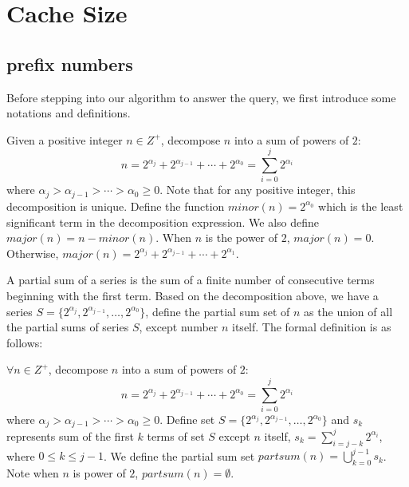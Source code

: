 \section{Cache Size}
\label{sec:cache size}

\subsection{prefix numbers}

Before stepping into our algorithm to answer the query, we first introduce some notations and definitions.

\begin{definition}
\label{defn: major&minor}
Given a positive integer $n\in Z^+$, decompose $n$ into a sum of powers of $2$: 
\[
n = 2^{\alpha_j}+2^{\alpha_{j-1}}+ \cdots + 2^{\alpha_0} = \sum_{i=0}^j2^{\alpha_i}
\]
where $\alpha_j>\alpha_{j-1}>\cdots>\alpha_0\geq 0$. Note that for any positive integer, this decomposition is unique.
Define the function $minor(n) = 2^{\alpha_0}$ which is the least significant term in the decomposition expression.
We also define $major(n) = n - minor(n)$. When $n$ is the power of $2$, $major(n) = 0$. Otherwise, $major(n) = 2^{\alpha_j}+2^{\alpha_{j-1}}+ \cdots + 2^{\alpha_1}$.
\end{definition}

A partial sum of a series is the sum of a finite number of consecutive terms beginning with the first term. Based on the decomposition above, we have a series $S = \{2^{\alpha_j}, 2^{\alpha_{j-1}}, \ldots, 2^{\alpha_0}\}$, define the partial sum set of $n$ as the union of all the partial sums of series $S$, except number $n$ itself. The formal definition is as follows:

\begin{definition}
\label{defn: partial sum set}
$\forall n\in Z^+$, decompose $n$ into a sum of powers of $2$:
\[
n = 2^{\alpha_j}+2^{\alpha_{j-1}}+ \cdots + 2^{\alpha_0} = \sum_{i=0}^j2^{\alpha_i}
\]
where $\alpha_j>\alpha_{j-1}>\cdots>\alpha_0\geq 0$. 
Define set $S = \{2^{\alpha_j}, 2^{\alpha_{j-1}}, \ldots, 2^{\alpha_0}\}$ and $s_k$ represents sum of the first $k$ terms of set $S$ except $n$ itself, $s_k = \sum_{i=j-k}^j2^{\alpha_i}$, where $0 \leq k \leq j-1$. We define the partial sum set $partsum(n) = \bigcup_{k=0}^{j-1}s_k$. Note when $n$ is power of $2$, $partsum(n) = \emptyset$.
\end{definition}


